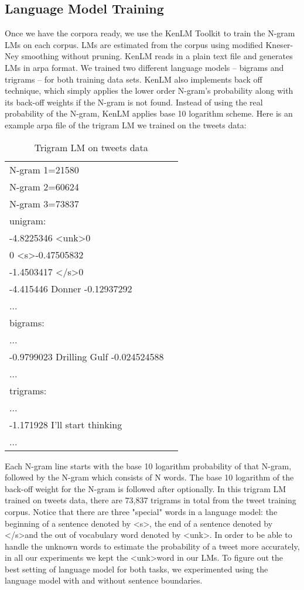 \documentclass[11pt,a4paper]{article}
\begin{document}
\subsection{Language Model Training}
Once we have the corpora ready, we use the KenLM Toolkit to train the N-gram LMs on each corpus. LMs are estimated from the corpus using modified Kneser-Ney smoothing without pruning. KenLM reads in a plain text file and generates LMs in arpa format. We trained two different language models -- bigrams and trigrams -- for both training data sets. KenLM also implements back off technique, which simply applies the lower order N-gram's probability along with its back-off weights if the N-gram is not found. Instead of using the real probability of the N-gram, KenLM applies base 10 logarithm scheme. Here is an example arpa file of the trigram LM we trained on the tweets data:

\begin{table}[h!]
\begin{tabular}{ |l |c|}
\hline
N-gram 1=21580 \\
N-gram 2=60624 \\
N-gram 3=73837 \\
\hline
unigram:\\
-4.8225346   \textless unk\textgreater  0 \\
0   \textless s\textgreater  -0.47505832 \\
-1.4503417   \textless /s\textgreater  0 \\
-4.415446   Donner  -0.12937292 \\
...\\
\hline
bigrams:\\
...\\
-0.9799023  Drilling Gulf -0.024524588\\
...\\
\hline
trigrams:\\
...\\
-1.171928 I'll start thinking\\
...\\
\hline
\end{tabular}
\caption{Trigram LM on tweets data}
\label{table:1}
\end{table}
\noindent
Each N-gram line starts with the base 10 logarithm probability of that N-gram, followed by the N-gram which consists of N words. The base 10 logarithm of the back-off weight for the N-gram is followed after optionally. In this trigram LM trained on tweets data, there are 73,837 trigrams in total from the tweet training corpus. Notice that there are three "special" words in a language model: the beginning of a sentence denoted by \textless s\textgreater, the end of a sentence denoted by \textless /s\textgreater and the out of vocabulary word denoted by \textless unk\textgreater. In order to be able to handle the unknown words to estimate the probability of a tweet more accurately, in all our experiments we kept the \textless unk\textgreater word in our LMs. To figure out the best setting of language model for both tasks, we experimented using the language model with and without sentence boundaries.
\end{document}
